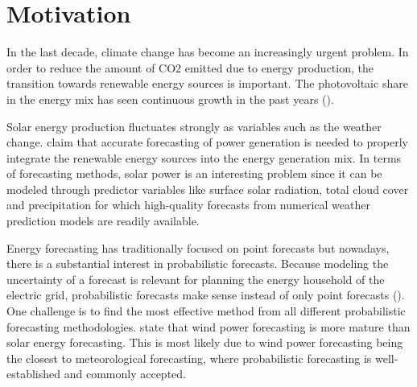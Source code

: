 \section{Motivation}
\label{sec:motivation}


In the last decade, climate change has become an increasingly urgent problem. 
In order to reduce the amount of CO2 emitted due to energy production, 
the transition towards renewable energy sources is important. 
The photovoltaic share in the energy mix has seen continuous growth in 
the past years (\Textcite{Snapshot2016}). 

Solar energy production fluctuates strongly as variables such as the weather change. 
\Textcite{Meer2018} claim that accurate forecasting of power generation is needed to properly 
integrate the renewable energy sources into the energy generation mix. 
In terms of forecasting methods, solar power is 
an interesting problem since it can be modeled through predictor variables 
like surface solar radiation, total cloud cover and precipitation 
for which high-quality forecasts from numerical weather prediction models are readily available. 


Energy forecasting has traditionally focused on point forecasts 
but nowadays, there is a substantial interest in probabilistic forecasts.
Because modeling the uncertainty of a forecast is relevant for planning the energy household of the electric grid, 
probabilistic forecasts make sense instead of only point forecasts (\Textcite{Meer2018}). 
One challenge is to find the most effective method from all different probabilistic forecasting methodologies. 
\Textcite{Hong2016} state that wind power forecasting is 
more mature than solar energy forecasting.
This is most likely due to 
wind power forecasting being the closest to meteorological forecasting, 
where probabilistic forecasting is well-established and commonly accepted. 


